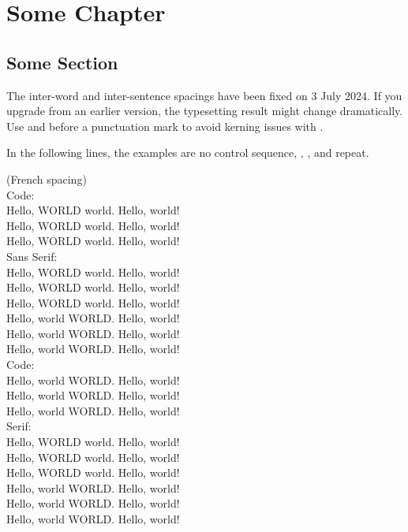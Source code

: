 \chapter{Some Chapter}

\section{Some Section}

The inter-word and inter-sentence spacings have been fixed on 3 July 2024.
If you upgrade from an earlier version,
the typesetting result might change dramatically.
Use \texttt{\string\willstop} and \texttt{\string\wontstop}
before a punctuation mark
to avoid kerning issues with \texttt{\string\@}.

In the following lines, the examples are
no control sequence,
\texttt{\string\willstop},
\texttt{\string\wontstop},
and repeat.

\frenchspacing
(French spacing)\\
{\ttfamily
Code:\\
Hello, WORLD world. Hello, world!\\
Hello, WORLD world\willstop. Hello, world!\\
Hello, WORLD world\wontstop. Hello, world!\\
{\sffamily
Sans Serif:\\
Hello, WORLD world. Hello, world!\\
Hello, WORLD world\willstop. Hello, world!\\
Hello, WORLD world\wontstop. Hello, world!\\
Hello, world WORLD. Hello, world!\\
Hello, world WORLD\willstop. Hello, world!\\
Hello, world WORLD\wontstop. Hello, world!\\
}%
Code:\\
Hello, world WORLD. Hello, world!\\
Hello, world WORLD\willstop. Hello, world!\\
Hello, world WORLD\wontstop. Hello, world!\\
}%
Serif:\\
Hello, WORLD world. Hello, world!\\
Hello, WORLD world\willstop. Hello, world!\\
Hello, WORLD world\wontstop. Hello, world!\\
Hello, world WORLD. Hello, world!\\
Hello, world WORLD\willstop. Hello, world!\\
Hello, world WORLD\wontstop. Hello, world!

